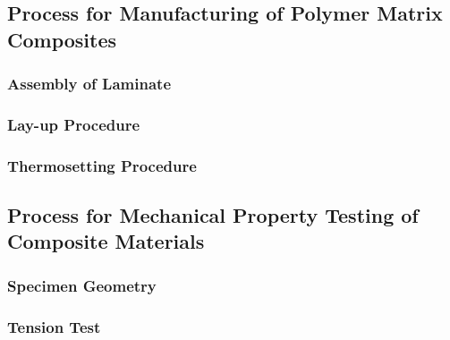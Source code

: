 \subsection{Process for Manufacturing of Polymer Matrix Composites}
\subsubsection{Assembly of Laminate}


\subsubsection{Lay-up Procedure}


\subsubsection{Thermosetting Procedure}



\subsection{Process for Mechanical Property Testing of Composite Materials}
\subsubsection{Specimen Geometry}


\subsubsection{Tension Test}